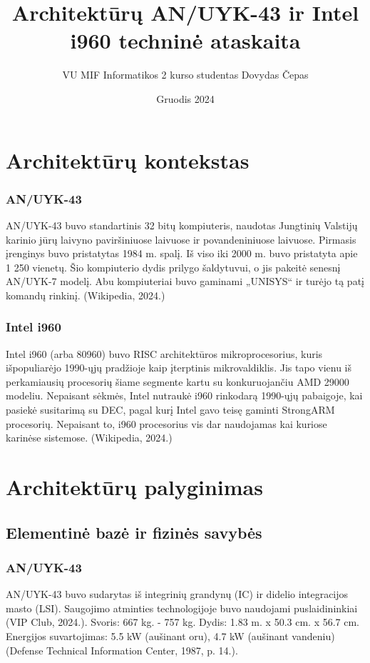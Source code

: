 \documentclass{article}
\title{Architektūrų AN/UYK-43 ir Intel i960 techninė ataskaita}
\author{VU MIF Informatikos 2 kurso studentas Dovydas Čepas}
\date{Gruodis 2024}
\begin{document}
\maketitle
\newpage
\section{Architektūrų kontekstas}
\subsubsection{AN/UYK-43}
AN/UYK-43 buvo standartinis 32 bitų kompiuteris, naudotas Jungtinių Valstijų karinio jūrų laivyno paviršiniuose laivuose ir povandeniniuose laivuose. Pirmasis įrenginys buvo pristatytas 1984 m. spalį. Iš viso iki 2000 m. buvo pristatyta apie 1 250 vienetų. Šio kompiuterio dydis prilygo šaldytuvui, o jis pakeitė senesnį AN/UYK-7 modelį. Abu kompiuteriai buvo gaminami „UNISYS“ ir turėjo tą patį komandų rinkinį. (Wikipedia, 2024.)
\subsubsection{Intel i960}
Intel i960 (arba 80960) buvo RISC architektūros mikroprocesorius, kuris išpopuliarėjo 1990-ųjų pradžioje kaip įterptinis mikrovaldiklis. Jis tapo vienu iš perkamiausių procesorių šiame segmente kartu su konkuruojančiu AMD 29000 modeliu. Nepaisant sėkmės, Intel nutraukė i960 rinkodarą 1990-ųjų pabaigoje, kai pasiekė susitarimą su DEC, pagal kurį Intel gavo teisę gaminti StrongARM procesorių. Nepaisant to, i960 procesorius vis dar naudojamas kai kuriose karinėse sistemose. (Wikipedia, 2024.)
\section{Architektūrų palyginimas}
\subsection{Elementinė bazė ir fizinės savybės}
\subsubsection{AN/UYK-43}
AN/UYK-43 buvo sudarytas iš integrinių grandynų (IC) ir didelio integracijos masto (LSI). Saugojimo atminties technologijoje buvo naudojami puslaidininkiai (VIP Club, 2024.). Svoris: 667 kg. - 757 kg. Dydis: 1.83 m. x 50.3 cm. x 56.7 cm. Energijos suvartojimas: 5.5 kW (aušinant oru), 4.7 kW (aušinant vandeniu) (Defense Technical Information Center, 1987, p. 14.).
\end{document}
